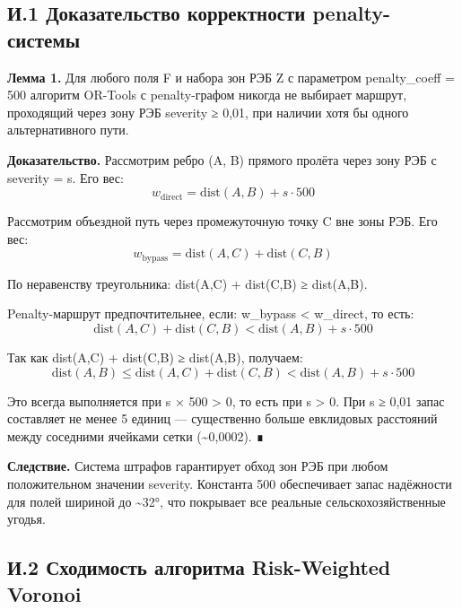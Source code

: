 \documentclass[14pt,a4paper]{extarticle}
\begin{document}
\hypertarget{ux438.1-ux434ux43eux43aux430ux437ux430ux442ux435ux43bux44cux441ux442ux432ux43e-ux43aux43eux440ux440ux435ux43aux442ux43dux43eux441ux442ux438-penalty-ux441ux438ux441ux442ux435ux43cux44b}{%
\subsection{И.1 Доказательство корректности penalty-системы}\label{ux438.1-ux434ux43eux43aux430ux437ux430ux442ux435ux43bux44cux441ux442ux432ux43e-ux43aux43eux440ux440ux435ux43aux442ux43dux43eux441ux442ux438-penalty-ux441ux438ux441ux442ux435ux43cux44b}}

\textbf{Лемма 1.} Для любого поля F и набора зон РЭБ Z с параметром penalty\_coeff = 500 алгоритм OR-Tools с penalty-графом никогда не выбирает маршрут, проходящий через зону РЭБ severity ≥ 0,01, при наличии хотя бы одного альтернативного пути.

\textbf{Доказательство.} Рассмотрим ребро (A, B) прямого пролёта через зону РЭБ с severity = s. Его вес: \[w_{\mathrm{direct}} = \mathrm{dist}(A,B) + s \cdot 500\]

Рассмотрим объездной путь через промежуточную точку C вне зоны РЭБ. Его вес: \[w_{\mathrm{bypass}} = \mathrm{dist}(A,C) + \mathrm{dist}(C,B)\]

По неравенству треугольника: dist(A,C) + dist(C,B) ≥ dist(A,B).

Penalty-маршрут предпочтительнее, если: w\_bypass \textless{} w\_direct, то есть: \[\mathrm{dist}(A,C) + \mathrm{dist}(C,B) < \mathrm{dist}(A,B) + s \cdot 500\]

Так как dist(A,C) + dist(C,B) ≥ dist(A,B), получаем: \[\mathrm{dist}(A,B) \leq \mathrm{dist}(A,C) + \mathrm{dist}(C,B) < \mathrm{dist}(A,B) + s \cdot 500\]

Это всегда выполняется при s × 500 \textgreater{} 0, то есть при s \textgreater{} 0. При s ≥ 0,01 запас составляет не менее 5 единиц --- существенно больше евклидовых расстояний между соседними ячейками сетки (\textasciitilde0,0002). ∎

\textbf{Следствие.} Система штрафов гарантирует обход зон РЭБ при любом положительном значении severity. Константа 500 обеспечивает запас надёжности для полей шириной до \textasciitilde32°, что покрывает все реальные сельскохозяйственные угодья.

\hypertarget{ux438.2-ux441ux445ux43eux434ux438ux43cux43eux441ux442ux44c-ux430ux43bux433ux43eux440ux438ux442ux43cux430-risk-weighted-voronoi}{%
\subsection{И.2 Сходимость алгоритма Risk-Weighted Voronoi}\label{ux438.2-ux441ux445ux43eux434ux438ux43cux43eux441ux442ux44c-ux430ux43bux433ux43eux440ux438ux442ux43cux430-risk-weighted-voronoi}}
\end{document}
